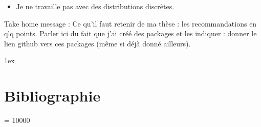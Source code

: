 \documentclass[
  12pt,
  french,
]{article}
\providecommand{\tightlist}{%
  \setlength{\itemsep}{0pt}\setlength{\parskip}{0pt}}
\begin{document}
\begin{itemize}
\tightlist
\item
  Je ne travaille pas avec des distributions discrètes.
\end{itemize}

Take home message : Ce qu'il faut retenir de ma thèse : les
recommandations en qlq points. Parler ici du fait que j'ai créé des
packages et les indiquer : donner le lien github vers ces packages (même
si déjà donné ailleurs).

\begingroup
\parindent 0pt
\renewcommand\notesname{{\normalsize Notes de fin de chapitre}}

\parskip 1ex \theendnotes \endgroup

\newpage

\hypertarget{bibliographie}{%
\section{Bibliographie}\label{bibliographie}}

\begingroup

\interlinepenalty = 10000
\end{document}
